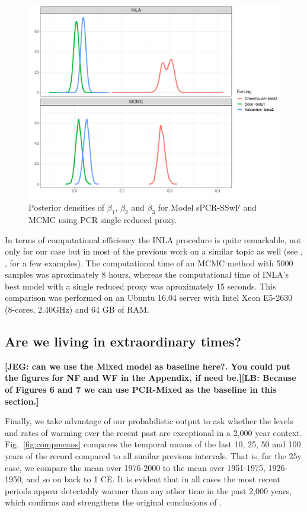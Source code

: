 \documentclass[12pt]{amsart}
\theoremstyle{plain}
\theoremstyle{definition}
\theoremstyle{remark}
\newcommand{\lb}[1]{\color{MidnightBlue}\textbf{[LB: #1]}\normalcolor}
\newcommand{\jeg}[1]{\color{ProcessBlue}\textbf{[JEG: #1]}\normalcolor}
\begin{document}
\begin{figure}
  \centering
  \includegraphics[scale=0.45]{PlotBetas}
  \caption{Posterior densities of $\beta_1$, $\beta_2$ and $\beta_3$ for Model
    sPCR-SSwF and MCMC using PCR single reduced proxy.}
  \label{fig:betas}
\end{figure}

In terms of computational efficiency the INLA procedure is quite remarkable, not only
for our case but in most of the previous work on a similar topic as well (see \cite{Rue2009},
\cite{Blangiardo2013}, \cite{Ruiz-Cardenas2012} for a few examples). The
computational time of an MCMC method with 5000 samples was
aproximately 8 hours, whereas the computational time of INLA's best model with
a single reduced proxy was aproximately 15 seconds. This comparison
was performed on an Ubuntu 16.04 server with Intel Xeon E5-2630 (8-cores,
2.40GHz) and 64 GB of RAM. 


\subsection{Are we living in extraordinary times?}

 \jeg{can we use the Mixed model as baseline here?. You could put the figures for
   NF and WF in the Appendix, if need be.}\lb{Because of Figures 6 and 7 we can
   use PCR-Mixed as the baseline in this section.}

Finally, we take advantage of our probabilistic output to ask whether the levels and rates of warming over the recent past are exceptional in a 2,000 year context.  Fig.~\ref{fig:compmeans} compares the temporal means of the last 10, 25, 50 and 100 years of the record compared to all similar previous intervals. That is, for the 25y case, we compare the mean over 1976-2000 to the mean over 1951-1975, 1926-1950, and so on back to 1 CE. It is evident that in all cases the most recent periods appear detectably warmer than any other time in the past 2,000 years, which confirms and strengthens the original conclusions of \cite{MBH99}.  
\end{document}
